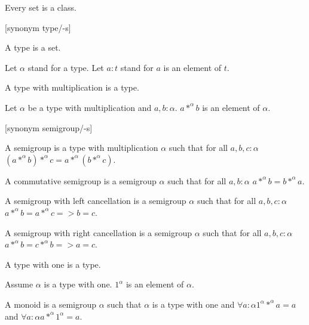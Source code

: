 \documentclass{article}
\begin{document}
\begin{forthel}

\begin{lemma} Every set is a class.
\end{lemma}

[synonym type/-s]
\begin{signature} A type is a set.
\end{signature}
Let $\alpha$ stand for a type.
Let $a : t$ stand for $a$ is an element of $t$.

\begin{signature} A type with multiplication is a type.
\end{signature}
\begin{signature} Let $\alpha$ be a type with multiplication and $a,b : \alpha$. 
$a *^{\alpha} b$ is an element of $\alpha$.
\end{signature}
  
[synonym semigroup/-s]
\begin{definition} A semigroup is a type with multiplication $\alpha$
such that for all $a,b,c : \alpha$
$(a *^{\alpha} b) *^{\alpha} c = a *^{\alpha} (b *^{\alpha} c)$. 
\end{definition}

\begin{definition} A commutative semigroup is a semigroup $\alpha$
such that for all $a,b : \alpha$
$a *^{\alpha} b = b *^{\alpha} a$.
\end{definition}

\begin{definition} A semigroup with left cancellation is a semigroup
$\alpha$ such that for all $a,b,c : \alpha$
$a *^{\alpha} b = a *^{\alpha} c => b = c$.
\end{definition}

\begin{definition} A semigroup with right cancellation is a semigroup
$\alpha$ such that for all $a,b,c : \alpha$
$a *^{\alpha} b = c *^{\alpha} b => a = c$.
\end{definition}

\begin{signature} A type with one is a type.
\end{signature}
\begin{signature} Assume $\alpha$ is a type with one. $1^{\alpha}$ is an
element of $\alpha$.
\end{signature}

\begin{definition} A monoid is a semigroup $\alpha$ such that $\alpha$ is a type
with one and
$\forall a : \alpha 1^{\alpha} *^{\alpha} a = a$ and
$\forall a : \alpha a *^{\alpha} 1^{\alpha} = a$.
\end{definition}


\end{forthel}
\end{document}
